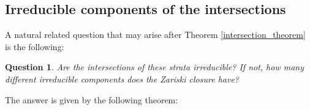 \documentclass{amsart}
\numberwithin{equation}{section}
\newtheorem{question}[theorem]{Question}
\theoremstyle{definition}
\theoremstyle{remark}
\begin{document}
\subsection{Irreducible components of the intersections}

A natural related question that may arise after Theorem \ref{intersection_theorem} is the following:

 \begin{question}
 Are the intersections of these strata irreducible? If not, how many different irreducible components does the Zariski closure have?
 \end{question}\newpage
The answer is given by the following theorem:
\end{document}
